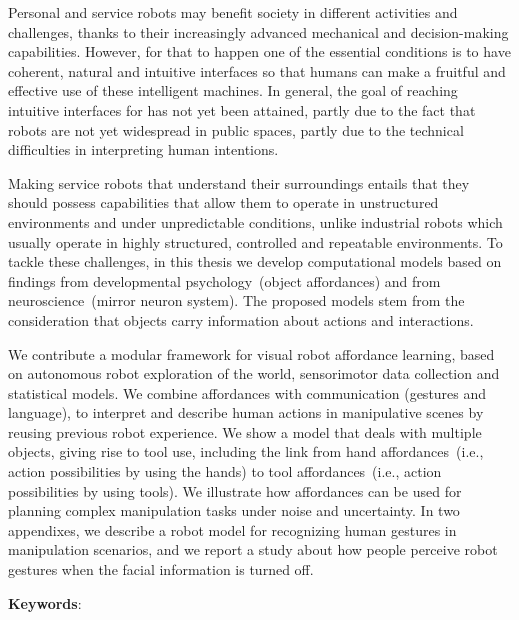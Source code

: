 
Personal and service robots may benefit society in different activities and challenges, thanks to their increasingly advanced mechanical and decision-making capabilities.
However, for that to happen one of the essential conditions is to have coherent, natural and intuitive interfaces so that humans can make a fruitful and effective use of these intelligent machines.
In general, the goal of reaching intuitive interfaces for \hri{} has not yet been attained, partly due to the fact that robots are not yet widespread in public spaces, partly due to the technical difficulties in interpreting human intentions.

Making service robots that understand their surroundings entails that they should possess capabilities that allow them to operate in unstructured environments and under unpredictable conditions, unlike industrial robots which usually operate in highly structured, controlled and repeatable environments.
To tackle these challenges, in this thesis we develop computational models based on findings from developmental psychology~(object affordances) and from neuroscience~(mirror neuron system).
The proposed models stem from the consideration that objects carry information about actions and interactions.

We contribute a modular framework for visual robot affordance learning, based on autonomous robot exploration of the world, sensorimotor data collection and statistical models.
We combine affordances with communication (gestures and language), to interpret and describe human actions in manipulative scenes by reusing previous robot experience.
We show a model that deals with multiple objects, giving rise to tool use, including the link from hand affordances~(i.e., action possibilities by using the hands) to tool affordances~(i.e., action possibilities by using tools).
We illustrate how affordances can be used for planning complex manipulation tasks under noise and uncertainty.
In two appendixes,
we describe a robot model for recognizing human gestures in manipulation scenarios,
and we report a study about how people perceive robot gestures when the facial information is turned off.

\bigskip

\textbf{Keywords}: \myThesisKeywords
